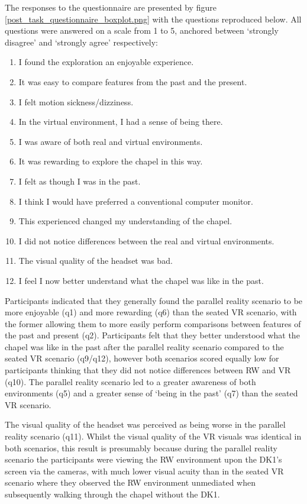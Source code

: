 The responses to the questionnaire are presented by figure \ref{post_task_questionnaire_boxplot.png} with the questions reproduced below. All questions were answered on a scale from 1 to 5, anchored between `strongly disagree' and `strongly agree' respectively:
\begin{enumerate}
	\item I found the exploration an enjoyable experience.
	\item It was easy to compare features from the past and the present.
	\item I felt motion sickness/dizziness.
	\item In the virtual environment, I had a sense of being there.
	\item I was aware of both real and virtual environments.
	\item It was rewarding to explore the chapel in this way.
	\item I felt as though I was in the past.
	\item I think I would have preferred a conventional computer monitor.
	\item This experienced changed my understanding of the chapel.
	\item I did not notice differences between the real and virtual environments.
	\item The visual quality of the headset was bad.
	\item I feel I now better understand what the chapel was like in the past.
\end{enumerate}

Participants indicated that they generally found the parallel reality scenario to be more enjoyable (q1) and more rewarding (q6) than the seated VR scenario, with the former allowing them to more easily perform comparisons between features of the past and present (q2). Participants felt that they better understood what the chapel was like in the past after the parallel reality scenario compared to the seated VR scenario (q9/q12), however both scenarios scored equally low for participants thinking that they did not notice differences between RW and VR (q10). The parallel reality scenario led to a greater awareness of both environments (q5) and a greater sense of `being in the past' (q7) than the seated VR scenario.

The visual quality of the headset was perceived as being worse in the parallel reality scenario (q11). Whilst the visual quality of the VR visuals was identical in both scenarios, this result is presumably because during the parallel reality scenario the participants were viewing the RW environment upon the DK1's screen via the cameras, with much lower visual acuity than in the seated VR scenario where they observed the RW environment unmediated when subsequently walking through the chapel without the DK1.

